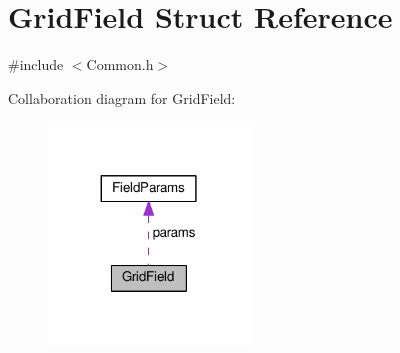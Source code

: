 \hypertarget{struct_grid_field}{}\section{Grid\+Field Struct Reference}
\label{struct_grid_field}


{\ttfamily \#include $<$Common.\+h$>$}



Collaboration diagram for Grid\+Field\+:
\nopagebreak
\begin{figure}[H]
\begin{center}
\leavevmode
\includegraphics[width=152pt]{struct_grid_field__coll__graph}
\end{center}
\end{figure}
